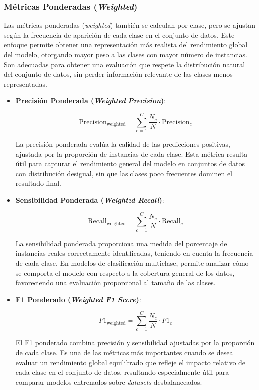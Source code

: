 \subsubsection*{Métricas Ponderadas (\textit{Weighted})}

Las métricas ponderadas (\textit{weighted}) también se calculan por clase, pero se ajustan según la frecuencia de aparición de cada clase en el conjunto de datos. Este enfoque permite obtener una representación más realista del rendimiento global del modelo, otorgando mayor peso a las clases con mayor número de instancias. Son adecuadas para obtener una evaluación que respete la distribución natural del conjunto de datos, sin perder información relevante de las clases menos representadas.

\begin{itemize}

\item \textbf{Precisión Ponderada (\textit{Weighted Precision})}:

\begin{equation}
\text{Precision}_{\text{weighted}} = \sum_{c=1}^{C} \frac{N_c}{N} \cdot \text{Precision}_c
\end{equation}

La precisión ponderada evalúa la calidad de las predicciones positivas, ajustada por la proporción de instancias de cada clase. Esta métrica resulta útil para capturar el rendimiento general del modelo en conjuntos de datos con distribución desigual, sin que las clases poco frecuentes dominen el resultado final.

\item \textbf{Sensibilidad Ponderada (\textit{Weighted Recall})}:

\begin{equation}
\text{Recall}_{\text{weighted}} = \sum_{c=1}^{C} \frac{N_c}{N} \cdot \text{Recall}_c
\end{equation}

La sensibilidad ponderada proporciona una medida del porcentaje de instancias reales correctamente identificadas, teniendo en cuenta la frecuencia de cada clase. En modelos de clasificación multiclase, permite analizar cómo se comporta el modelo con respecto a la cobertura general de los datos, favoreciendo una evaluación proporcional al tamaño de las clases.

\item \textbf{F1 Ponderado (\textit{Weighted F1 Score})}:

\begin{equation}
F1_{\text{weighted}} = \sum_{c=1}^{C} \frac{N_c}{N} \cdot F1_c
\end{equation}

El F1 ponderado combina precisión y sensibilidad ajustadas por la proporción de cada clase. Es una de las métricas más importantes cuando se desea evaluar un rendimiento global equilibrado que refleje el impacto relativo de cada clase en el conjunto de datos, resultando especialmente útil para comparar modelos entrenados sobre \textit{datasets} desbalanceados.

\end{itemize}

